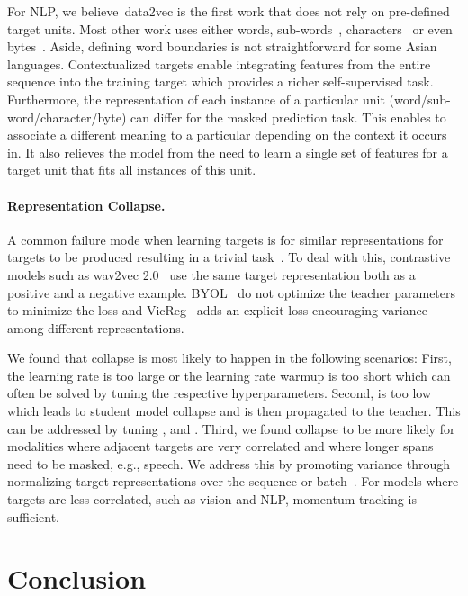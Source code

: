 \documentclass[nohyperref]{article}
\theoremstyle{plain}
\theoremstyle{definition}
\theoremstyle{remark}
\newcommand{\name}{data2vec}
\begin{document}
For NLP, we believe~\name{} is the first work that does not rely on pre-defined target units.
Most other work uses either words, sub-words~\citep{radford2018unsup,devlin2018bert}, characters~\citep{tay2021charformer} or even bytes~\citep{xue2021byt5}.
Aside, defining word boundaries is not straightforward for some  Asian languages.
Contextualized targets enable integrating features from the entire sequence into the training target which provides a richer self-supervised task. 
Furthermore, the representation of each instance of a particular unit (word/sub-word/character/byte) can differ for the masked prediction task.
This enables to associate a different meaning to a particular depending on the context it occurs in.
It also relieves the model from the need to learn a single set of features for a target unit that fits all instances of this unit.

\paragraph{Representation Collapse.}
A common failure mode when learning targets is for similar representations for targets to be produced resulting in a trivial task~\citep{jing2021understanding}.
To deal with this, contrastive models such as wav2vec 2.0~\citep{baevski2020wav} use the same target representation both as a positive and a negative example.
BYOL~\citep{grill2020byol} do not optimize the teacher parameters to minimize the loss and VicReg~\citep{bardes2021vicreg} adds an explicit loss encouraging variance among different representations.

We found that collapse is most likely to happen in the following scenarios: 
First, the learning rate is too large or the learning rate warmup is too short which can often be solved by tuning the respective hyperparameters.
Second,  is too low which leads to student model collapse and is then propagated to the teacher. 
This can be addressed by tuning ,  and .
Third, we found collapse to be more likely for modalities where adjacent targets are very correlated and where longer spans need to be masked, e.g., speech.
We address this by promoting variance through normalizing target representations over the sequence or batch~\citep{grill2020byol}.
For models where targets are less correlated, such as vision and NLP, momentum tracking is sufficient. 



\section{Conclusion}
\end{document}
